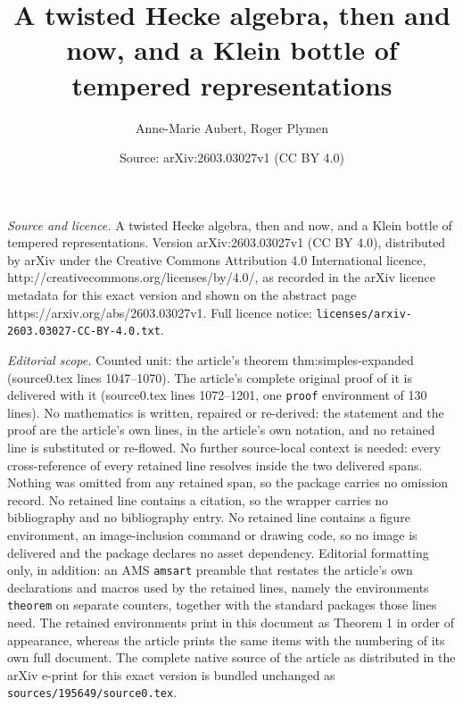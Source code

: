 \documentclass[10pt,a4paper]{amsart}
\title{A twisted Hecke algebra, then and now, and a Klein bottle of tempered representations}
\author{Anne-Marie Aubert, Roger Plymen}
\date{Source: arXiv:2603.03027v1 (CC BY 4.0)}
\begin{document}
\maketitle

\noindent\emph{Source and licence.} A twisted Hecke algebra, then and now, and a Klein bottle of tempered representations. Version arXiv:2603.03027v1 (CC BY 4.0), distributed by arXiv under the Creative Commons Attribution 4.0 International licence, http://creativecommons.org/licenses/by/4.0/, as recorded in the arXiv licence metadata for this exact version and shown on the abstract page https://arxiv.org/abs/2603.03027v1. Full licence notice: \texttt{licenses/arxiv-2603.03027-CC-BY-4.0.txt}.\par\smallskip

\noindent\textit{Editorial scope.} Counted unit: the article's theorem thm:simples-expanded (source0.tex lines 1047--1070). The article's complete original proof of it is delivered with it (source0.tex lines 1072--1201, one \texttt{proof} environment of 130 lines). No mathematics is written, repaired or re-derived: the statement and the proof are the article's own lines, in the article's own notation, and no retained line is substituted or re-flowed.  No further source-local context is needed: every cross-reference of every retained line resolves inside the two delivered spans.  Nothing was omitted from any retained span, so the package carries no omission record.  No retained line contains a citation, so the wrapper carries no bibliography and no bibliography entry.  No retained line contains a figure environment, an image-inclusion command or drawing code, so no image is delivered and the package declares no asset dependency.  Editorial formatting only, in addition: an AMS \texttt{amsart} preamble that restates the article's own declarations and macros used by the retained lines, namely the environments \texttt{theorem} on separate counters, together with the standard packages those lines need.  The retained environments print in this document as Theorem 1 in order of appearance, whereas the article prints the same items with the numbering of its own full document.  The complete native source of the article as distributed in the arXiv e-print for this exact version is bundled unchanged as \texttt{sources/195649/source0.tex}.
\end{document}

